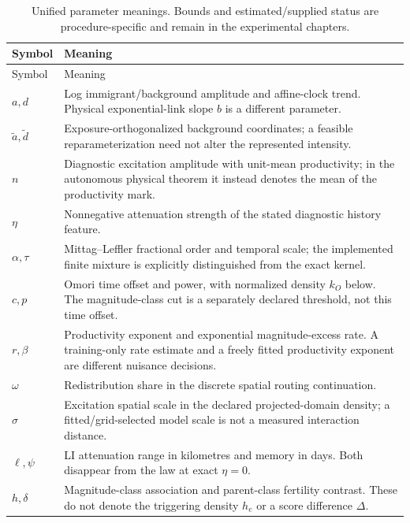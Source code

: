\begin{longtable}{@{}p{}p{}@{}}
\caption{Unified parameter meanings. Bounds and estimated/supplied status are procedure-specific and remain in the experimental chapters.}\label{tab:parameter-dictionary}\\
\toprule Symbol & Meaning \\\midrule\endfirsthead
\toprule Symbol & Meaning \\\midrule\endhead
$a,d$ & Log immigrant/background amplitude and affine-clock trend. Physical exponential-link slope $b$ is a different parameter. \\
$\widetilde a,\widetilde d$ & Exposure-orthogonalized background coordinates; a feasible reparameterization need not alter the represented intensity. \\
$n$ & Diagnostic excitation amplitude with unit-mean productivity; in the autonomous physical theorem it instead denotes the mean of the productivity mark. \\
$\eta$ & Nonnegative attenuation strength of the stated diagnostic history feature. \\
$\alpha,\tau$ & Mittag--Leffler fractional order and temporal scale; the implemented finite mixture is explicitly distinguished from the exact kernel. \\
$c,p$ & Omori time offset and power, with normalized density $k_O$ below. The magnitude-class cut is a separately declared threshold, not this time offset. \\
$r,\beta$ & Productivity exponent and exponential magnitude-excess rate. A training-only rate estimate and a freely fitted productivity exponent are different nuisance decisions. \\
$\omega$ & Redistribution share in the discrete spatial routing continuation. \\
$\sigma$ & Excitation spatial scale in the declared projected-domain density; a fitted/grid-selected model scale is not a measured interaction distance. \\
$\ell,\psi$ & LI attenuation range in kilometres and memory in days. Both disappear from the law at exact $\eta=0$. \\
$h,\delta$ & Magnitude-class association and parent-class fertility contrast. These do not denote the triggering density $h_e$ or a score difference $\Delta$. \\
\bottomrule
\end{longtable}

